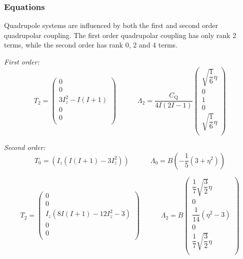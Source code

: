 \documentclass[11pt,a4paper]{article}
\begin{document}
\subsubsection*{Equations}
Quadrupole systems are influenced by both the first and second order quadrupolar coupling. The first
order quadrupolar coupling has only rank 2 terms, while the second order has rank 0, 2 and 4
terms.

\textit{First order:}
\begin{equation}
  T_{2} = \left( \begin{array}{c}
0 \\
0 \\
3 I_z^2 - I (I+1) \\
0 \\
0\\
  \end{array} \right)
  \quad\quad\quad
  \Lambda_2 = \dfrac{C_\text{Q}}{4  I (2 I - 1)} \left( \begin{array}{c}
  \sqrt{\dfrac{1}{6}} \eta\\
  0\\
  1\\
  0\\
  \sqrt{\dfrac{1}{6}} \eta\\
  \end{array} \right)
\end{equation}


\textit{Second order:}
\begin{equation}
  T_{0} = \left( I_z (I(I+1)-3 I_z^2) \right)
  \quad\quad\quad
  \Lambda_{0} = B \left( -\dfrac{1}{5} (3 + \eta^2) \right)
\end{equation}

\begin{equation}
  T_{2} = \left( \begin{array}{c}
0 \\
0 \\
I_z (8 I (I + 1) -12 I_z^2 - 3) \\
0 \\
0\\
  \end{array} \right)
  \quad\quad\quad
  \Lambda_{2} = B \left( \begin{array}{c}
\dfrac{1}{7} \sqrt{\dfrac{3}{2}} \eta \\
0 \\
\dfrac{1}{14} (\eta^2 - 3) \\
0 \\
\dfrac{1}{7} \sqrt{\dfrac{3}{2}} \eta\\
  \end{array} \right)
\end{equation}
\end{document}
